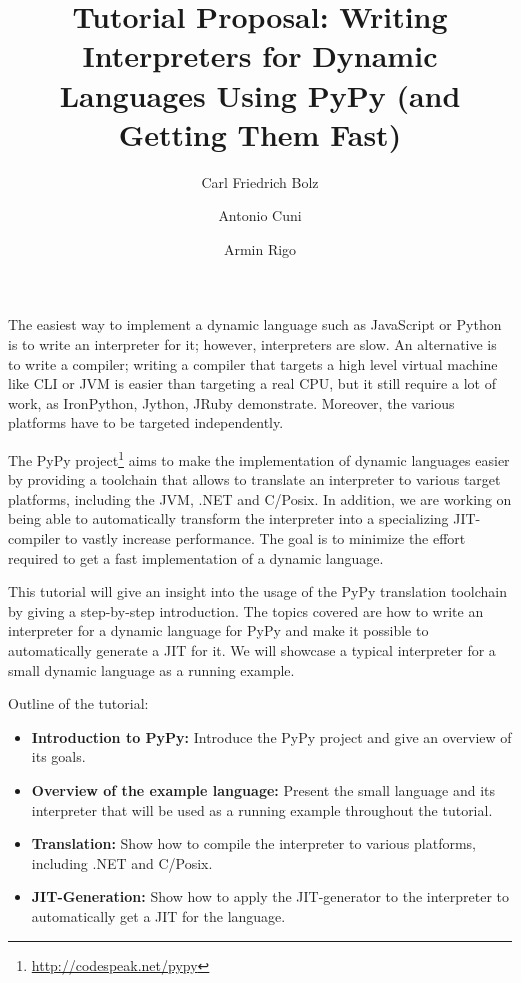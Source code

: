 \documentclass{llncs}
\let\oldcite=\cite
\renewcommand\cite[1]{\ifthenelse{\equal{#1}{XXX}}{[citation~needed]}{\oldcite{#1}}}
\begin{document}
\title{Tutorial Proposal: Writing Interpreters for Dynamic Languages Using PyPy
(and Getting Them Fast)}


\author{Carl Friedrich Bolz  \and Antonio Cuni  \and Armin Rigo }


\maketitle

The easiest way to implement a dynamic language such as JavaScript or Python is
to write an interpreter for it; however, interpreters are slow. An alternative
is to write a compiler; writing a compiler that targets a high level virtual
machine like CLI or JVM is easier than targeting a real CPU, but it still
require a lot of work, as IronPython, Jython, JRuby demonstrate. Moreover,
the various platforms have to be targeted independently.

The PyPy project\footnote{\url{http://codespeak.net/pypy}} \cite{RiBo07_223}
aims to make the implementation of dynamic
languages easier by providing a toolchain that allows to translate an
interpreter to various target platforms, including the JVM, .NET and C/Posix. 
In addition, we are working on being able to automatically transform the
interpreter into a specializing JIT-compiler to vastly increase performance.
The goal is to minimize the effort required to get a fast implementation of a
dynamic language.

This tutorial will give an insight into the usage of the PyPy translation
toolchain by giving a step-by-step introduction. The topics covered are how to
write an interpreter for a dynamic language for PyPy and make it possible to
automatically generate a JIT for it.  We will showcase a typical interpreter for a
small dynamic language as a running example.



Outline of the tutorial:
\begin{itemize}
 \item \textbf{Introduction to PyPy:} Introduce the PyPy project and give an
 overview of its goals.
 \item \textbf{Overview of the example language:} Present the small language and
 its interpreter that will be used as a running example throughout the tutorial.
 \item \textbf{Translation:} Show how to compile the interpreter to various
 platforms, including .NET and C/Posix.
 \item \textbf{JIT-Generation:} Show how to apply the JIT-generator to the
 interpreter to automatically get a JIT for the language.
\end{itemize}
\end{document}
